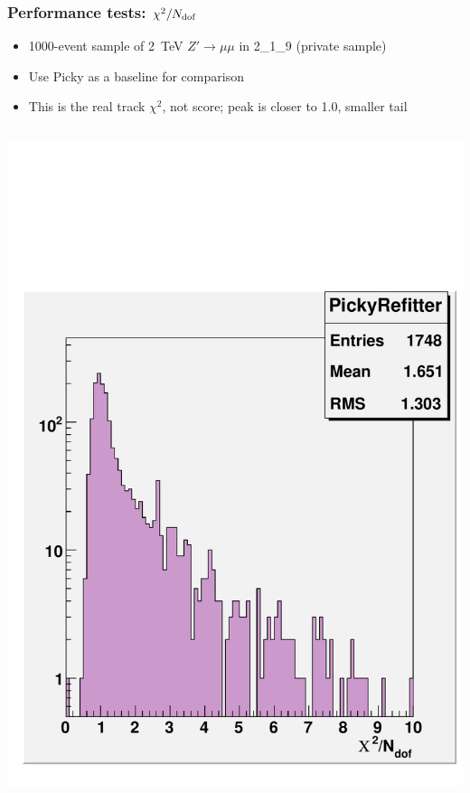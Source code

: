 \documentclass[compress]{beamer}
\begin{document}
\begin{frame}
\frametitle{Performance tests: $\chi^2/N_{\mbox{\scriptsize dof}}$}

\begin{itemize}
\item 1000-event sample of 2~TeV $Z'\to\mu\mu$ in 2\_1\_9 (private sample)
\item Use Picky as a baseline for comparison
\item This is the real track $\chi^2$, not score; peak is closer to 1.0, smaller tail
\end{itemize}

\vfill
\begin{columns}
\includegraphics[width=\linewidth]{chi2_picky.pdf}

\end{columns}
\end{frame}
\end{document}

